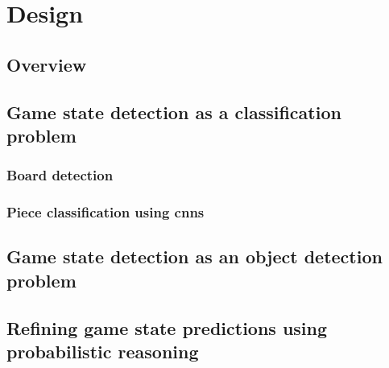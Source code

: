 \documentclass[../main.tex]{subfiles}
\begin{document}
\chapter{Design}
\section{Overview}


\section{Game state detection as a classification problem}
\subsection{Board detection}
\subsection{Piece classification using \glspl{cnn}}

\section{Game state detection as an object detection problem}
\section{Refining game state predictions using probabilistic reasoning}
\end{document}
